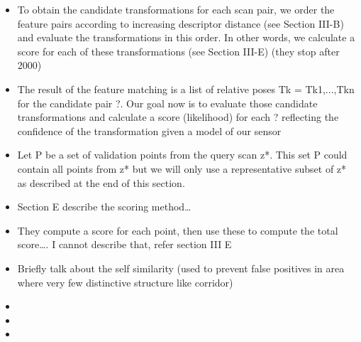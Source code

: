 \begin{itemize}
    \item To obtain the candidate transformations for each scan pair, we order the feature pairs according to increasing descriptor distance (see Section III-B) and evaluate the transformations in this order. In other words, we calculate a score for each of these transformations (see Section III-E) (they stop after 2000)
    \item The result of the feature matching is a list of relative poses Tk = Tk1,...,Tkn for the candidate pair ?. Our goal now is to evaluate those candidate transformations and calculate a score (likelihood) for each ? reflecting the confidence of the transformation given a model of our sensor
    \item Let P be a set of validation points from the query scan z*. This set P could contain all points from z* but we will only use a representative subset of z* as described at the end of this section.
    \item Section E describe the scoring method\dots
    \item They compute a score for each point, then use these to compute the total score\dots. I cannot describe that, refer section III E
    \item Briefly talk about the self similarity (used to prevent false positives in area where very few distinctive structure like corridor)
    \item
    \item
    \item
\end{itemize}

